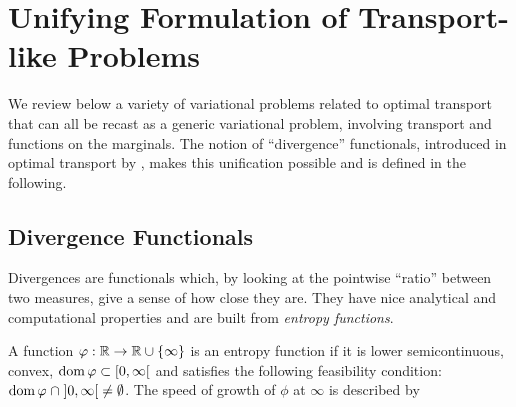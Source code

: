 
\section{Unifying Formulation of Transport-like Problems}
\label{sec-ot-like}
We review below a variety of variational problems related to optimal transport that can all be recast as a generic variational problem, involving transport and functions on the marginals. The notion of ``divergence'' functionals, introduced in optimal transport by \cite{LieroMielkeSavareLong}, makes this unification possible and is defined in the following.


\subsection{Divergence Functionals}
\label{sec_divergencefunc}
Divergences are functionals which, by looking at the pointwise ``ratio'' between two measures, give a sense of how close they are. They have nice analytical and computational properties and are built from \emph{entropy functions}.

\begin{definition}
\label{def_entropy}
A function $\varphi : \mathbb{R} \to \mathbb{R} \cup \{\infty\}$ is an entropy function if it is lower semicontinuous, convex, $\operatorname{dom} \varphi\subset [0,\infty[$ and satisfies the following feasibility condition:  $\operatorname{dom} \varphi \; \cap\;  ]0, \infty[\; \neq \emptyset$. The speed of growth of $\phi$ at $\infty$ is described by %
%
\end{definition}
%


